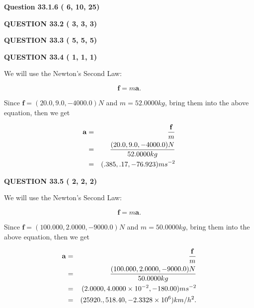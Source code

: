 \documentclass[12pt]{article}
\begin{document}
 
 
  
\vspace{0.2in}
  
{\textbf{\Large{Question
33.1.6 
 (          6,         10,         25)
}}}
  
  
  
\vspace{0.2in}
  
{\textbf{\Large{QUESTION
33.2 
 (          3,          3,          3)
}}}
  
  
  
\vspace{0.2in}
  
{\textbf{\Large{QUESTION
33.3 
 (          5,          5,          5)
}}}
  
  
  
\vspace{0.2in}
  
{\textbf{\Large{QUESTION
33.4 
 (          1,          1,          1)
}}}
  
  


 
 

We will use the Newton's Second Law:
 
\[
\mathbf{f}=m\mathbf{a}.
\]
 
Since $\mathbf{f}= %
(20.0 , 9.0 , -4000.0) N$
and $m= %
52.0000kg$, bring them into the above equation, then we get
 
\begin{eqnarray*}
\mathbf{a}&=&\frac{\mathbf{f}}m  \\
&=&\frac{ %
(20.0 , 9.0 , -4000.0) N}{ %
52.0000kg}  \\
&=& %
(.385 , .17 , -76.923) ms^{-2}
\end{eqnarray*}
 
 
 
  
\vspace{0.2in}
  
{\textbf{\Large{QUESTION
33.5 
 (          2,          2,          2)
}}}
  
  
 
 

We will use the Newton's Second Law:
 
\[
\mathbf{f}=m\mathbf{a}.
\]
 
Since $\mathbf{f}=( %
100.000,  %
2.0000,  %
-9000.0 )N$
and $m= %
50.0000kg$, bring them into the above equation, then we get
 
\begin{eqnarray*}
\mathbf{a}&=&\frac{\mathbf{f}}m  \\
&=&\frac{(
100.000 ,
2.0000 ,
-9000.0 )N
}{ %
50.0000 kg}  \\
&=&(
2.0000 ,
4.0000 \times 10^{-2},
-180.00
)ms^{-2} \\
&=&(
25920. ,
518.40 ,
-2.3328 \times 10^{6}
)km/h^2.
\end{eqnarray*}
 
\end{document}
